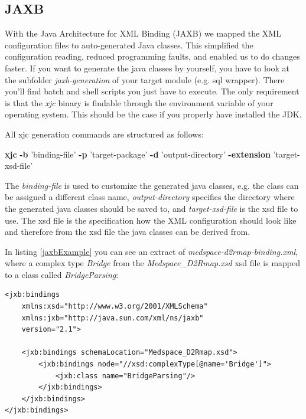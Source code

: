 \subsection{JAXB}

With the Java Architecture for XML Binding \cite{JAXB} (JAXB) we mapped the XML configuration files to auto-generated Java classes. This simplified the configuration reading, reduced programming faults, and enabled us to do changes faster. If you want to generate the java classes by yourself, you have to look at the subfolder \emph{jaxb-generation} of your target module (e.g. sql wrapper). There you'll find batch and shell scripts you just have to execute. The only requirement is that the \emph{xjc} binary is findable through the environment variable of your operating system. This should be the case if you properly have installed the JDK.

All xjc generation commands are structured as follows:

\begin{codebox}
	\textbf{xjc} \textbf{-b} 'binding-file' \textbf{-p} 'target-package' \textbf{-d} 'output-directory' \textbf{-extension} 'target-xsd-file'
\end{codebox}

The \emph{binding-file} is used to customize the generated java classes, e.g. the class can be assigned a different class name, \emph{output-directory} specifies the directory where the generated java classes should be saved to, and \emph{target-xsd-file} is the xsd file to use. The xsd file is the specification how the XML configuration should look like and therefore from the xsd file the java classes can be derived from.

In listing \ref{jaxbExample} you can see an extract of \emph{medspace-d2rmap-binding.xml}, where a complex type \emph{Bridge} from the \emph{Medspace\_D2Rmap.xsd} xsd file is mapped to a class called \emph{BridgeParsing}:

\begin{lstlisting}[style=RdfCodeStyle, caption=JAXB binding example, label=jaxbExample]
<jxb:bindings 
    xmlns:xsd="http://www.w3.org/2001/XMLSchema"
    xmlns:jxb="http://java.sun.com/xml/ns/jaxb"
    version="2.1">

    <jxb:bindings schemaLocation="Medspace_D2Rmap.xsd">
		<jxb:bindings node="//xsd:complexType[@name='Bridge']">
			<jxb:class name="BridgeParsing"/>
		</jxb:bindings>
    </jxb:bindings>
</jxb:bindings>
\end{lstlisting}

